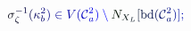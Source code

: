 \documentclass[12pt]{article}
\begin{document}
\makeatletter
\renewcommand*{\@textcolor}[3]{%
  \protect\leavevmode
  \begingroup
    \color#1{#2}#3%
  \endgroup
}
\makeatother
\begin{displaymath}
\mathcolor[RGB]{0,0,15}{\sigma} _ { \mathcolor[RGB]{0,0,30}{\zeta} } ^ { \mathcolor[RGB]{0,0,45}{-} \mathcolor[RGB]{0,0,60}{1} } \mathcolor[RGB]{0,0,75}{(} \mathcolor[RGB]{0,0,90}{\kappa} _ { \mathcolor[RGB]{0,0,105}{b} } ^ { \mathcolor[RGB]{0,0,120}{2} } \mathcolor[RGB]{0,0,135}{)} \mathcolor[RGB]{0,0,150}{\in} \mathcolor[RGB]{0,0,165}{V} \mathcolor[RGB]{0,0,180}{(} \mathcal { \mathcolor[RGB]{0,0,195}{C} } _ { \mathcolor[RGB]{0,0,210}{a} } ^ { \mathcolor[RGB]{0,0,225}{2} } \mathcolor[RGB]{0,0,240}{)} \mathcolor[RGB]{0,0,255}{\setminus} \mathcolor[RGB]{0,15,0}{N} _ { \mathcolor[RGB]{0,15,15}{X} _ { \mathcolor[RGB]{0,15,30}{L} } } \mathcolor[RGB]{0,15,45}{[} \mathrm { \mathcolor[RGB]{0,15,60}{b} \mathcolor[RGB]{0,15,75}{d} } \mathcolor[RGB]{0,15,90}{(} \mathcal { \mathcolor[RGB]{0,15,105}{C} } _ { \mathcolor[RGB]{0,15,120}{a} } ^ { \mathcolor[RGB]{0,15,135}{2} } \mathcolor[RGB]{0,15,150}{)} \mathcolor[RGB]{0,15,165}{]} \mathcolor[RGB]{0,15,180}{;}
\end{displaymath}
\end{document}
